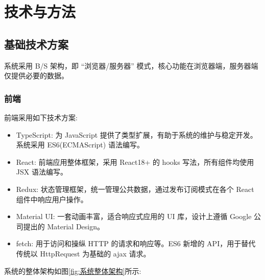 \section{技术与方法}

\subsection{基础技术方案}

系统采用 B/S 架构，即 ``浏览器/服务器'' 模式，核心功能在浏览器端，服务器端仅提供必要的数据。

\subsubsection{前端}

前端采用如下技术方案:

\begin{itemize}
  \item TypeScript: 为 JavaScript 提供了类型扩展，有助于系统的维护与稳定开发。系统采用 ES6(ECMAScript) 语法编写。
  \item React: 前端应用整体框架，采用 React18+ 的 hooks 写法，所有组件均使用 JSX 语法编写。
  \item Redux: 状态管理框架，统一管理公共数据，通过发布订阅模式在各个 React 组件中响应用户操作。
  \item Material UI: 一套动画丰富，适合响应式应用的 UI 库，设计上遵循 Google 公司提出的 Material Design。
  \item fetch: 用于访问和操纵 HTTP 的请求和响应等。ES6 新增的 API，用于替代传统以 HttpRequest 为基础的 ajax 请求。
\end{itemize}

系统的整体架构如图\ref{fig:系统整体架构}所示:

